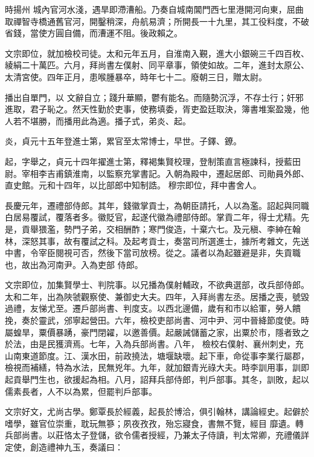 \begin{pinyinscope}
 時揚州
 城內官河水淺，遇旱即滯漕船。乃奏自城南閶門西七里港開河向東，屈曲取禪智寺橋通舊官河，開鑿稍深，舟航易濟；所開長一十九里，其工役料度，不破省錢，當使方圓自備，而漕運不阻。後政賴之。



 文宗即位，就加檢校司徒。太和元年五月，自淮南入覲，進大小銀碗三千四百枚、綾絹二十萬匹。六月，拜尚書左僕射、同平章事，領使如故。二年，進封太原公、太清宮使。四年正月，患喉腫暴卒，時年七十二。廢朝三日，贈太尉。



 播出自單門，以
 文辭自立；踐升華顯，鬱有能名。而隨勢沉浮，不存士行；奸邪進取，君子恥之。然天性勤於吏事，使務填委，胥吏盈廷取決，簿書堆案盈幾，他人若不堪勝，而播用此為適。播子式，弟炎、起。



 炎，貞元十五年登進士第，累官至太常博士，早世。子鐸、鐐。



 起，字舉之，貞元十四年擢進士第，釋褐集賢校理，登制策直言極諫科，授藍田尉。宰相李吉甫鎮淮南，以監察充掌書記。入朝為殿中，遷起居郎、司勛員外郎、直史館。元和十四年，以比部郎中知制誥。
 穆宗即位，拜中書舍人。



 長慶元年，遷禮部侍郎。其年，錢徽掌貢士，為朝臣請托，人以為濫。詔起與同職白居易覆試，覆落者多。徽貶官，起遂代徽為禮部侍郎。掌貢二年，得士尤精。先是，貢舉猥濫，勢門子弟，交相酬酢；寒門俊造，十棄六七。及元稹、李紳在翰林，深怒其事，故有覆試之科。及起考貢士，奏當司所選進士，據所考雜文，先送中書，令宰臣閱視可否，然後下當司放榜。從之。議者以為起雖避是非，失貢職也，故出為河南尹。入為吏部
 侍郎。



 文宗即位，加集賢學士、判院事。以兄播為僕射輔政，不欲典選部，改兵部侍郎。太和二年，出為陜虢觀察使、兼御史大夫。四年，入拜尚書左丞。居播之喪，號毀過禮，友悌尤至。遷戶部尚書、判度支。以西北邊備，歲有和市以給軍，勞人饋挽，奏於靈武，邠寧起營田。六年，檢校吏部尚書、河中尹、河中晉絳節度使。時屬蝗旱，粟價暴踴，豪門閉糴，以邀善價。起嚴誡儲蓄之家，出粟於市，隱者致之於法，由是民獲濟焉。七年，入為兵部尚書。八年，
 檢校右僕射、襄州刺史，充山南東道節度。江、漢水田，前政撓法，塘堰缺壞。起下車，命從事李業行屬郡，檢視而補繕，特為水法，民無兇年。九年，就加銀青光祿大夫。時李訓用事，訓即起貢舉門生也，欲援起為相。八月，詔拜兵部侍郎，判戶部事。其冬，訓敗，起以儒素長者，人不以為累，但罷判戶部事。



 文宗好文，尤尚古學。鄭覃長於經義，起長於博洽，俱引翰林，講論經史。起僻於嗜學，雖官位崇重，耽玩無篸；夙夜孜孜，殆忘寢食，書無不覽，經目
 靡遺。轉兵部尚書。以莊恪太子登儲，欲令儒者授經，乃兼太子侍讀，判太常卿，充禮儀詳定使，創造禮神九玉，奏議曰：




\end{pinyinscope}
